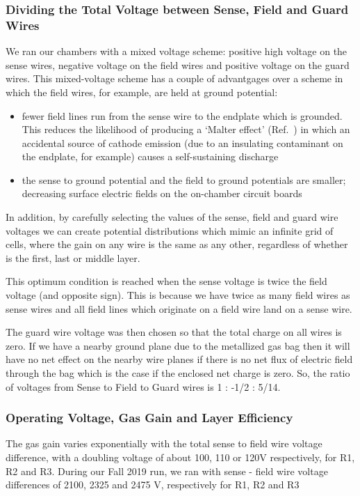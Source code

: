 \subsubsection{Dividing the Total Voltage between Sense, Field and Guard Wires}
We ran our chambers with a mixed voltage scheme:
positive high voltage on the sense wires, negative voltage on the
field wires and positive voltage on the guard wires.
This mixed-voltage scheme has a couple of advantgages over a scheme in
which the field wires, for example, are held at ground potential:
\begin{itemize}
\item fewer field lines run from the sense wire to the endplate which
is grounded.  This reduces the likelihood of producing a `Malter effect'
(Ref.~\cite{malter}) in which an accidental source of cathode emission
(due to an insulating contaminant on the endplate, for example) causes
a self-sustaining discharge
\item the sense to ground potential and the field to ground potentials 
are smaller; decreasing surface electric fields on the on-chamber
circuit boards
\end{itemize}

In addition, by carefully selecting the values of the sense, field and
guard wire voltages we can create potential distributions which mimic
an infinite grid of cells, where the gain on any wire is the same as
any other, regardless of whether is the first, last or middle layer.

This optimum condition is reached when the sense voltage is twice the
field voltage (and opposite sign).  This is because we have twice as many
field wires as sense wires and all field lines which originate on a
field wire land on a sense wire.  

The guard wire voltage was then chosen so that the total charge on all wires is zero.  
If we have a nearby ground plane due to the metallized gas bag then it will
have no net effect on the nearby wire planes if there is no net flux of
electric field through the bag which is the case if the enclosed net charge
is zero.
So, the ratio of voltages from Sense to Field to Guard wires is 1 : -1/2 : 5/14.

\subsubsection{Operating Voltage, Gas Gain and Layer Efficiency}
The gas gain varies exponentially with the total sense to field wire voltage
difference, with a doubling voltage of about 100, 110 or 120V respectively, for
R1, R2 and R3.  During our Fall 2019 run, we ran with sense - field wire voltage
differences of 2100, 2325 and 2475 V, respectively for R1, R2 and R3


